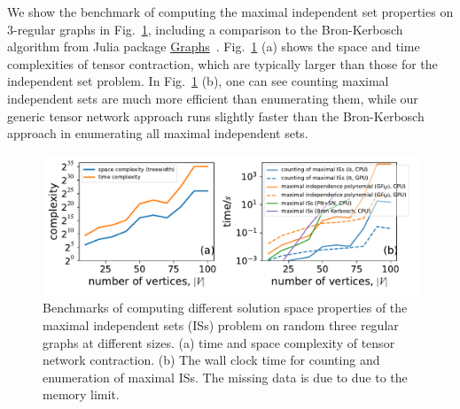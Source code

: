 \documentclass[onefignum, onetabnum]{siamart190516}
\newcommand{\<}{\langle}
\renewcommand{\>}{\rangle}
\newcommand{\Fig}[1]{Fig.~\ref{#1}}
\begin{document}
We show the benchmark of computing the maximal independent set properties on $3$-regular graphs in \Fig{fig:benchmark-maximal},
including a comparison to the Bron-Kerbosch algorithm from Julia package \href{https://github.com/JuliaGraphs/Graphs.jl}{Graphs}~\cite{Graphs}.
\Fig{fig:benchmark-maximal} (a) shows the space and time complexities of tensor contraction, which are typically larger than those for the independent set problem.
In \Fig{fig:benchmark-maximal} (b), one can see counting maximal independent sets are much more efficient than enumerating them, while our generic tensor network approach runs slightly faster than the Bron-Kerbosch approach in enumerating all maximal independent sets.

\begin{figure} 
    \centering
    \includegraphics[width=\textwidth, trim={0cm 0cm 0cm 0cm}, clip]{figures/fig2.pdf}
    \caption{Benchmarks of computing different solution space properties of the maximal independent sets (ISs) problem on random three regular graphs at different sizes.
    (a) time and space complexity of tensor network contraction. 
    (b) The wall clock time for counting and enumeration of maximal ISs. The missing data is due to due to the memory limit.
    }
    \label{fig:benchmark-maximal}
\end{figure}
\end{document}
